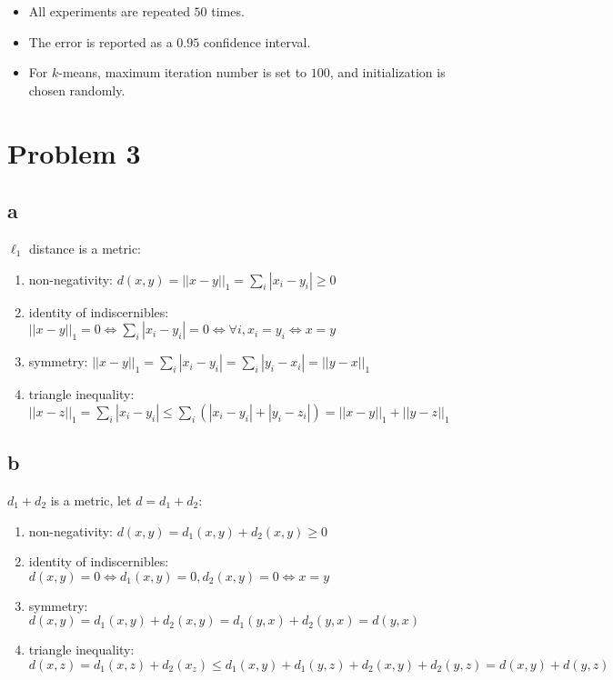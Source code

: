 \documentclass[a4paper,11pt]{article}
\theoremstyle{mytheor}
\begin{document}
\begin{itemize}
	\item All experiments are repeated $50$ times.
	\item The error is reported as a $0.95$ confidence interval.
	\item For $k$-means, maximum iteration number is set to $100$, and initialization is chosen randomly.
\end{itemize}

\section*{Problem 3}
\subsection*{a}
$\ell_1$ distance is a metric:
\begin{enumerate}
	\item non-negativity: $d(x,y) = ||x-y||_1 = \sum\limits_{i} |x_i - y_i| \geq 0$
	\item identity of indiscernibles: $||x-y||_1 = 0   \Leftrightarrow \sum\limits_{i} |x_i - y_i| = 0 \Leftrightarrow \forall i, x_i = y_i 
	\Leftrightarrow x = y$ 
	\item symmetry: $||x-y||_1 = \sum\limits_{i}|x_i - y_i| = \sum\limits_{i}|y_i - x_i| = ||y-x||_1$
	\item triangle inequality: $||x-z||_1 = \sum\limits_{i}|x_i - y_i| \leq \sum\limits_{i}(|x_i-y_i| + |y_i-z_i|) = ||x - y||_1 + ||y-z||_1 $
\end{enumerate}


\subsection*{b}
$d_1 + d_2$ is a metric, let $d = d_1 + d_2$:
\begin{enumerate}
	\item non-negativity: $d(x,y) = d_1(x,y) + d_2(x,y) \geq 0$
	\item identity of indiscernibles: $d(x,y) = 0 \Leftrightarrow d_1(x,y) = 0, d_2(x,y) = 0 \Leftrightarrow x = y$
	\item symmetry: $d(x,y) = d_1(x,y) + d_2(x,y) = d_1(y,x) + d_2(y,x) = d(y,x)$
	\item triangle inequality: $d(x,z) = d_1(x,z) + d_2(x_z) \leq d_1(x,y) + d_1(y,z) + d_2(x,y) + d_2(y,z) = d(x,y) + d(y,z) $
\end{enumerate}
\end{document}
